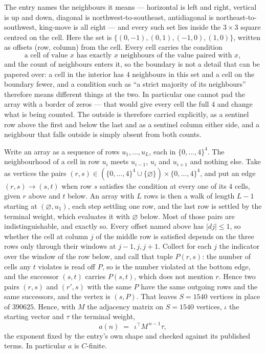 \documentclass[11pt,a4paper]{article}
\theoremstyle{plain}
\theoremstyle{definition}
\begin{document}
The entry names the neighbours it means --- horizontal is left and right, vertical is up and
down, diagonal is northwest-to-southeast, antidiagonal is northeast-to-southwest, king-move is
all eight --- and every such set lies inside the $3\times3$ square centred on the cell. Here
the set is $\{(0,-1), (0,1), (-1,0), (1,0)\}$, written as offsets (row, column) from the cell. Every cell carries
the condition
\[
\text{a cell of value }x\text{ has exactly }x\text{ neighbours of the value paired with }x,
\]
and the count of neighbours enters it, so the boundary is not a detail that can be papered
over: a cell in the interior has $4$ neighbours in this set and a cell on the boundary
fewer, and a condition such as ``a strict majority of its neighbours'' therefore means
different things at the two. In particular one cannot pad the array with a border of zeros ---
that would give every cell the full $4$ and change what is being counted. The outside is
therefore carried
explicitly, as a sentinel row above the first and below the last and as a sentinel column
either side, and a neighbour that falls outside is simply absent from both counts.

Write an array as a sequence of rows $u_1,\dots,u_L$, each in
$\{0,\dots,4\}^{4}$. The neighbourhood of a cell in row $u_i$ meets $u_{i-1}$,
$u_i$ and $u_{i+1}$ and nothing else. Take as vertices the pairs
$(r,s)\in(\{0,\dots,4\}^{4}\cup\{\varnothing\})\times\{0,\dots,4\}^{4}$,
and put an edge $(r,s)\to(s,t)$ when row $s$ satisfies the condition at every one of its
$4$ cells, given $r$ above and $t$ below. An array with $L$ rows is then a walk of length
$L-1$ starting at $(\varnothing,u_1)$, each step settling one row, and the last row is
settled by the terminal weight, which evaluates it with $\varnothing$ below. Most of those pairs are indistinguishable, and exactly so. Every offset named above has $|dj|\le 1$, so whether the cell at column $j$ of the middle row is satisfied depends on the three rows only through their windows at $j-1,j,j+1$. Collect for each $j$ the indicator over the window of the row below, and call that tuple $P(r,s)$: the number of cells any $t$ violates is read off $P$, so is the number violated at the bottom edge, and the successor $(s,t)$ carries $P(s,t)$, which does not mention $r$. Hence two pairs $(r,s)$ and $(r',s)$ with the same $P$ have the same outgoing rows and the same successors, and the vertex is $(s,P)$. That leaves $S=1540$ vertices in place of $390625$. Hence,
with $M$ the adjacency matrix on $S=1540$ vertices, $\iota$ the starting vector and $\tau$ the
terminal weight,
\[
a(n)\;=\;\,\iota^{\!\top}M^{\,n-1}\tau ,
\]
the exponent fixed by the entry's own shape and checked against its published terms. In
particular $a$ is $C$-finite.
\end{document}
